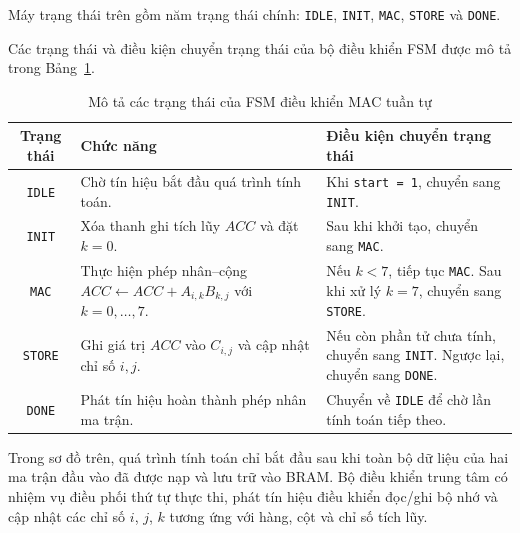 Máy trạng thái trên gồm năm trạng thái chính:
\texttt{IDLE}, \texttt{INIT}, \texttt{MAC},
\texttt{STORE} và \texttt{DONE}.


Các trạng thái và điều kiện chuyển trạng thái
của bộ điều khiển FSM được mô tả trong
Bảng~\ref{tab:sequential_mac_fsm}.

\begin{table}[htbp]
\centering
\caption{Mô tả các trạng thái của FSM điều khiển MAC tuần tự}
\label{tab:sequential_mac_fsm}
\renewcommand{\arraystretch}{1.4}
\small
\begin{tabular}{|c|p{}|p{}|}
\hline
\textbf{Trạng thái} &
\textbf{Chức năng} &
\textbf{Điều kiện chuyển trạng thái} \\
\hline

\texttt{IDLE} &
Chờ tín hiệu bắt đầu quá trình tính toán. &
Khi \texttt{start = 1}, chuyển sang \texttt{INIT}. \\
\hline

\texttt{INIT} &
Xóa thanh ghi tích lũy $ACC$ và đặt $k=0$. &
Sau khi khởi tạo, chuyển sang \texttt{MAC}. \\
\hline

\texttt{MAC} &
Thực hiện phép nhân--cộng
$ACC \leftarrow ACC + A_{i,k}B_{k,j}$
với $k=0,\ldots,7$. &
Nếu $k<7$, tiếp tục \texttt{MAC}.
Sau khi xử lý $k=7$, chuyển sang \texttt{STORE}. \\
\hline

\texttt{STORE} &
Ghi giá trị $ACC$ vào $C_{i,j}$
và cập nhật chỉ số $i,j$. &
Nếu còn phần tử chưa tính, chuyển sang \texttt{INIT}.
Ngược lại, chuyển sang \texttt{DONE}. \\
\hline

\texttt{DONE} &
Phát tín hiệu hoàn thành phép nhân ma trận. &
Chuyển về \texttt{IDLE} để chờ lần tính toán tiếp theo. \\
\hline

\end{tabular}
\end{table}
Trong sơ đồ trên, quá trình tính toán chỉ bắt đầu
sau khi toàn bộ dữ liệu của hai ma trận đầu vào
đã được nạp và lưu trữ vào BRAM. Bộ điều khiển trung tâm có nhiệm vụ điều phối
thứ tự thực thi, phát tín hiệu điều khiển đọc/ghi bộ nhớ
và cập nhật các chỉ số $i$, $j$, $k$ tương ứng với
hàng, cột và chỉ số tích lũy.

